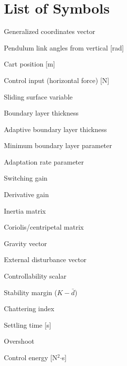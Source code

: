 \documentclass[12pt,a4paper,oneside]{report}
\newcommand{\eeff}{\epsilon_{\text{eff}}}
\newcommand{\emin}{\epsilon_{\min}}
\newcommand{\dbar}{\bar{d}}
\newcommand{\Ts}{T_s}
\newcommand{\vect}[1]{\mathbf{#1}}
\begin{document}
\chapter*{List of Symbols}

\begin{description}[leftmargin=3cm, style=nextline]
\item[$\vect{q}$] Generalized coordinates vector
\item[$\theta_1, \theta_2$] Pendulum link angles from vertical [rad]
\item[$x$] Cart position [m]
\item[$u$] Control input (horizontal force) [N]
\item[$s$] Sliding surface variable
\item[$\epsilon$] Boundary layer thickness
\item[$\eeff$] Adaptive boundary layer thickness
\item[$\emin$] Minimum boundary layer parameter
\item[$\alpha$] Adaptation rate parameter
\item[$K$] Switching gain
\item[$k_d$] Derivative gain
\item[$\vect{M}(\vect{q})$] Inertia matrix
\item[$\vect{C}(\vect{q}, \dot{\vect{q}})$] Coriolis/centripetal matrix
\item[$\vect{G}(\vect{q})$] Gravity vector
\item[$\vect{d}(t)$] External disturbance vector
\item[$\beta$] Controllability scalar
\item[$\eta$] Stability margin ($K - \dbar$)
\item[$C$] Chattering index
\item[$\Ts$] Settling time [s]
\item[$O$] Overshoot
\item[$E$] Control energy [N$^2$$\cdot$s]
\end{description}

\cleardoublepage
{}
\end{document}
